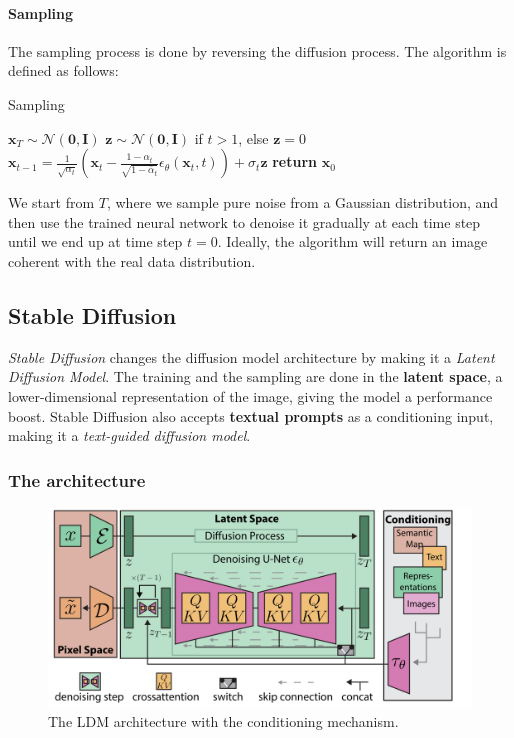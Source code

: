 \documentclass[preprint]{elsarticle}
\begin{document}
\paragraph{Sampling}
The sampling process is done by reversing the diffusion process. The algorithm is defined as follows:

\begin{algorithm}[b]
    \caption{Sampling}\label{alg:sampling}
    \begin{algorithmic}[1]
    \State $\mathbf{x}_T \sim \mathcal{N}(\mathbf{0},\mathbf{I})$
        \State $\mathbf{z} \sim \mathcal{N}(\mathbf{0}, \mathbf{I})$ if $t >1$, else $\mathbf{z} =0$
        \State $\mathbf{x}_{t-1} = \frac{1}{\sqrt{\alpha_t}}\left(\mathbf{x}_t - \frac{1-\alpha_t}{\sqrt{1-\bar{\alpha}_t}}\epsilon_\theta(\mathbf{x}_t,t)\right) + \sigma_t \mathbf{z}$
    \EndFor
    \State \textbf{return} $\mathbf{x}_0$
    \end{algorithmic}
\end{algorithm}


We start from $T$, where we sample pure noise from a Gaussian distribution, 
and then use the trained neural network to denoise it gradually at each time step until we end up at time step $t=0$.
Ideally, the algorithm will return an image coherent with the real data distribution.


\subsection{Stable Diffusion}\label{sec:stable-diffusion}
\emph{Stable Diffusion} \cite{rombach2022highresolution} changes the diffusion model architecture by making 
it a \emph{Latent Diffusion Model}. 
The training and the sampling are done in the \textbf{latent space}, 
a lower-dimensional representation of the image, giving the model a performance boost.
Stable Diffusion also accepts \textbf{textual prompts} as a conditioning input, making it a \emph{text-guided diffusion model}.

\subsubsection{The architecture}\label{sec:ldm-architecture} 

\begin{figure}[b]
	\centering
    \includegraphics[scale=0.9]{img/svg/SDArch.png}
	\caption{The LDM architecture with the conditioning mechanism.}\label{fig:ldm-architecture}
\end{figure}
\end{document}
